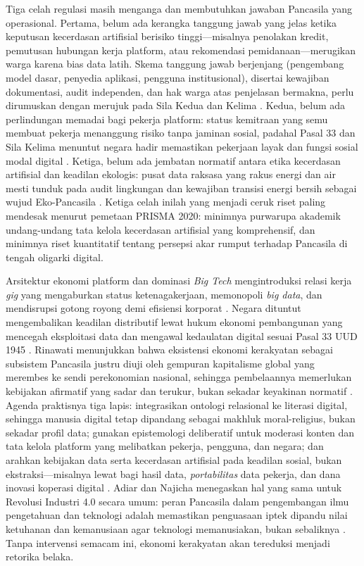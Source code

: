 \documentclass[journal]{IEEEtran}
\begin{document}
Tiga celah regulasi masih menganga dan membutuhkan jawaban Pancasila yang operasional. Pertama, belum ada kerangka tanggung jawab yang jelas ketika keputusan kecerdasan artifisial berisiko tinggi---misalnya penolakan kredit, pemutusan hubungan kerja platform, atau rekomendasi pemidanaan---merugikan warga karena bias data latih. Skema tanggung jawab berjenjang (pengembang model dasar, penyedia aplikasi, pengguna institusional), disertai kewajiban dokumentasi, audit independen, dan hak warga atas penjelasan bermakna, perlu dirumuskan dengan merujuk pada Sila Kedua dan Kelima \cite{kominfo2023,uupdp2022}. Kedua, belum ada perlindungan memadai bagi pekerja platform: status kemitraan yang semu membuat pekerja menanggung risiko tanpa jaminan sosial, padahal Pasal 33 dan Sila Kelima menuntut negara hadir memastikan pekerjaan layak dan fungsi sosial modal digital \cite{uud1945,hatta1977,rahmatullah2022}. Ketiga, belum ada jembatan normatif antara etika kecerdasan artifisial dan keadilan ekologis: pusat data raksasa yang rakus energi dan air mesti tunduk pada audit lingkungan dan kewajiban transisi energi bersih sebagai wujud Eko-Pancasila \cite{yusa2022,kominfo2023}. Ketiga celah inilah yang menjadi ceruk riset paling mendesak menurut pemetaan PRISMA 2020: minimnya purwarupa akademik undang-undang tata kelola kecerdasan artifisial yang komprehensif, dan minimnya riset kuantitatif tentang persepsi akar rumput terhadap Pancasila di tengah oligarki digital.

Arsitektur ekonomi platform dan dominasi \textit{Big Tech} mengintroduksi relasi kerja \textit{gig} yang mengaburkan status ketenagakerjaan, memonopoli \textit{big data}, dan mendisrupsi gotong royong demi efisiensi korporat \cite{kurniasih2016,rahmatullah2022}. Negara dituntut mengembalikan keadilan distributif lewat hukum ekonomi pembangunan yang mencegah eksploitasi data dan mengawal kedaulatan digital sesuai Pasal 33 UUD 1945 \cite{uud1945,hatta1977}. Rinawati menunjukkan bahwa eksistensi ekonomi kerakyatan sebagai subsistem Pancasila justru diuji oleh gempuran kapitalisme global yang merembes ke sendi perekonomian nasional, sehingga pembelaannya memerlukan kebijakan afirmatif yang sadar dan terukur, bukan sekadar keyakinan normatif \cite{rinawati2020,hatta1977}. Agenda praktisnya tiga lapis: integrasikan ontologi relasional ke literasi digital, sehingga manusia digital tetap dipandang sebagai makhluk moral-religius, bukan sekadar profil data; gunakan epistemologi deliberatif untuk moderasi konten dan tata kelola platform yang melibatkan pekerja, pengguna, dan negara; dan arahkan kebijakan data serta kecerdasan artifisial pada keadilan sosial, bukan ekstraksi---misalnya lewat bagi hasil data, \textit{portabilitas} data pekerja, dan dana inovasi koperasi digital \cite{rahmatullah2022,kominfo2023,basit2023}. Adiar dan Najicha menegaskan hal yang sama untuk Revolusi Industri 4.0 secara umum: peran Pancasila dalam pengembangan ilmu pengetahuan dan teknologi adalah memastikan penguasaan iptek dipandu nilai ketuhanan dan kemanusiaan agar teknologi memanusiakan, bukan sebaliknya \cite{adiar2023}. Tanpa intervensi semacam ini, ekonomi kerakyatan akan tereduksi menjadi retorika belaka.
\end{document}
